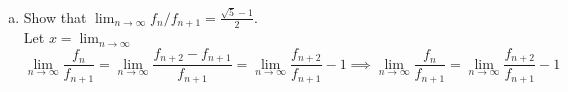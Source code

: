 \documentclass{article}
\begin{document}
\begin{description}
\begin{enumerate}[(a)]
		\item Show that $\lim_{n\to\infty} {f_n/f_{n+1}=\frac{\sqrt{5}-1}{2}}$. \\
		Let $x=\lim_{n\to\infty}$
		\begin{dmath*}
			\lim_{n\to\infty} {\frac{f_n}{f_{n+1}}}=\lim_{n\to\infty}\frac{f_{n+2}-f_{n+1}}{f_{n+1}}=\lim_{n\to\infty} \frac{f_{n+2}}{f_{n+1}}-1\implies {\lim_{n\to\infty}{\frac{f_n}{f_{n+1}}}=\lim_{n\to\infty} \frac{f_{n+2}}{f_{n+1}}-1}
		\end{dmath*}
		\end{enumerate}
		
	\end{description}
\end{document}
